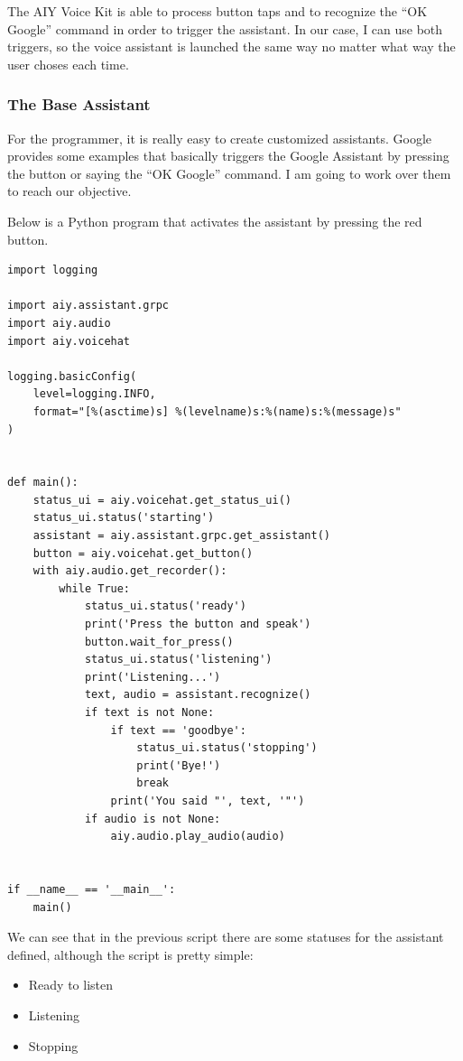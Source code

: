 The AIY Voice Kit is able to process button taps and to recognize the “OK Google” command in order to trigger the assistant. In
our case, I can use both triggers, so the voice assistant is launched the same way no matter what way the user choses each time.

\subsubsection{The Base Assistant}
For the programmer, it is really easy to create customized assistants. Google provides some examples that basically triggers the
Google Assistant by pressing the button or saying the “OK Google” command. I am going to work over them to reach our objective.

Below is a Python program that activates the assistant by pressing the red button.

\begin{lstlisting}[style=PythonCode]
import logging

import aiy.assistant.grpc
import aiy.audio
import aiy.voicehat

logging.basicConfig(
    level=logging.INFO,
    format="[%(asctime)s] %(levelname)s:%(name)s:%(message)s"
)


def main():
	status_ui = aiy.voicehat.get_status_ui()
	status_ui.status('starting')
	assistant = aiy.assistant.grpc.get_assistant()
	button = aiy.voicehat.get_button()
	with aiy.audio.get_recorder():
        while True:
            status_ui.status('ready')
            print('Press the button and speak')
            button.wait_for_press()
            status_ui.status('listening')
            print('Listening...')
            text, audio = assistant.recognize()
            if text is not None:
                if text == 'goodbye':
                    status_ui.status('stopping')
                    print('Bye!')
                    break
                print('You said "', text, '"')
            if audio is not None:
                aiy.audio.play_audio(audio)


if __name__ == '__main__':
    main()
\end{lstlisting}

We can see that in the previous script there are some statuses for the assistant defined, although the script is pretty simple:
\begin{itemize}
    \item Ready to listen
    \item Listening
    \item Stopping
\end{itemize}

